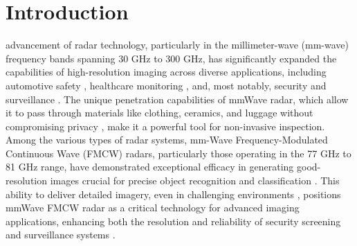 \documentclass[journal,article,submit,pdftex,moreauthors]{Definitions/mdpi}
\begin{document}







\section{Introduction}
 advancement of radar technology, particularly in the millimeter-wave (mm-wave) frequency bands spanning 30 GHz to 300 GHz, has significantly expanded the capabilities of high-resolution imaging across diverse applications, including automotive safety \cite{alvarez2019millimeter, smith2022radar}, healthcare monitoring \cite{li2020wireless, zhang2022neural, guo2021deep}, and, most notably, security and surveillance \cite{liu2021deep, chen2021image, park2020high}. The unique penetration capabilities of mmWave radar, which allow it to pass through materials like clothing, ceramics, and luggage without compromising privacy \cite{cianca2013radar, lee2020radar, sun2019machine}, make it a powerful tool for non-invasive inspection. Among the various types of radar systems, mm-Wave Frequency-Modulated Continuous Wave (FMCW) radars, particularly those operating in the 77 GHz to 81 GHz range, have demonstrated exceptional efficacy in generating good-resolution images crucial for precise object recognition and classification \cite{gao2020synthetic, zheng2019robust, huang2022millimeter}. This ability to deliver detailed imagery, even in challenging environments \cite{liu2023dynamic, zhang2023radar, yu2023machine}, positions mmWave FMCW radar as a critical technology for advanced imaging applications, enhancing both the resolution and reliability of security screening and surveillance systems \cite{liu2022fusion, li2022deep, chen2023real}.
\end{document}
